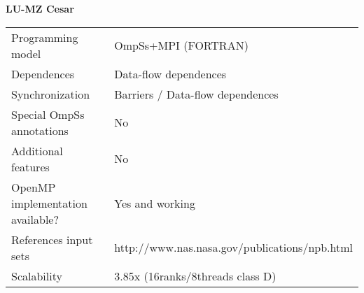 
\section*{}
\label{nas_lu-mz_cesar}

\centering
\Huge
\textbf{LU-MZ Cesar}

\begin{table}[h!]
  \large
  \centering
  \begin{tabular}{|l|l|}
    \hline
    Programming model                &  OmpSs+MPI (FORTRAN)\\
    Dependences                      &  Data-flow dependences\\
    Synchronization                  &  Barriers / Data-flow dependences\\
    Special OmpSs annotations        &  No\\
    Additional features              &  No\\
    OpenMP implementation available? &  Yes and working\\
    References input sets            &  http://www.nas.nasa.gov/publications/npb.html\\
    Scalability                      &  3.85x (16ranks/8threads class D)\\
    \hline
  \end{tabular}
\end{table}

\newpage
